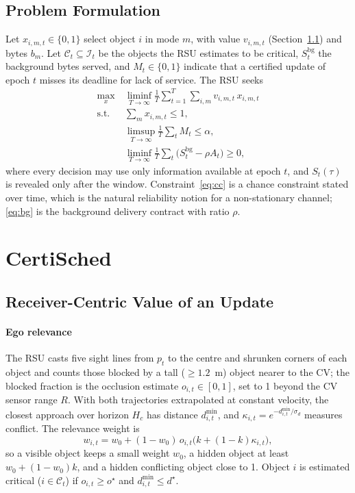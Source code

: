 \documentclass[journal]{IEEEtran}
\theoremstyle{remark}
\begin{document}
\subsection{Problem Formulation}
Let $x_{i,m,t}\in\{0,1\}$ select object $i$ in mode $m$, with value $v_{i,m,t}$ (Section~\ref{sec:value}) and bytes $b_m$. Let $\mathcal C_t\subseteq\mathcal I_t$ be the objects the RSU estimates to be critical, $S^{\mathrm{bg}}_t$ the background bytes served, and $M_t\in\{0,1\}$ indicate that a certified update of epoch $t$ misses its deadline for lack of service. The RSU seeks
\begin{align}
\max_{x}\ & \liminf_{T\to\infty}\frac1T\sum_{t=1}^{T}\sum_{i,m}v_{i,m,t}\,x_{i,m,t} \label{eq:obj}\\
\text{s.t. }& \textstyle\sum_m x_{i,m,t}\le 1, \label{eq:one}\\
& \limsup_{T\to\infty}\tfrac1T\textstyle\sum_{t}M_t\le\alpha, \label{eq:cc}\\
& \liminf_{T\to\infty}\tfrac1T\textstyle\sum_t \big(S^{\mathrm{bg}}_t-\rho A_t\big)\ge 0, \label{eq:bg}
\end{align}
where every decision may use only information available at epoch $t$, and $S_t(\tau)$ is revealed only after the window. Constraint~\eqref{eq:cc} is a chance constraint stated over time, which is the natural reliability notion for a non-stationary channel; \eqref{eq:bg} is the background delivery contract with ratio $\rho$.

\section{CertiSched}\label{sec:method}
\subsection{Receiver-Centric Value of an Update}\label{sec:value}
\paragraph*{Ego relevance} The RSU casts five sight lines from $p_t$ to the centre and shrunken corners of each object and counts those blocked by a tall ($\ge1.2$~m) object nearer to the CV; the blocked fraction is the occlusion estimate $o_{i,t}\in[0,1]$, set to 1 beyond the CV sensor range $R$. With both trajectories extrapolated at constant velocity, the closest approach over horizon $H_c$ has distance $d^{\min}_{i,t}$, and $\kappa_{i,t}=e^{-d^{\min}_{i,t}/\sigma_d}$ measures conflict. The relevance weight is
\begin{equation}
w_{i,t}=w_0+(1-w_0)\,o_{i,t}\big(k+(1-k)\kappa_{i,t}\big),
\end{equation}
so a visible object keeps a small weight $w_0$, a hidden object at least $w_0+(1-w_0)k$, and a hidden conflicting object close to 1. Object $i$ is estimated critical ($i\in\mathcal C_t$) if $o_{i,t}\ge o^\star$ and $d^{\min}_{i,t}\le d^\star$.
\end{document}
